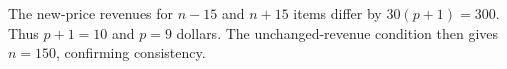 The new-price revenues for $n-15$ and $n+15$ items differ by $30(p+1)=300$. Thus $p+1=10$ and $\boxed{p=9}$ dollars. The unchanged-revenue condition then gives $n=150$, confirming consistency.
